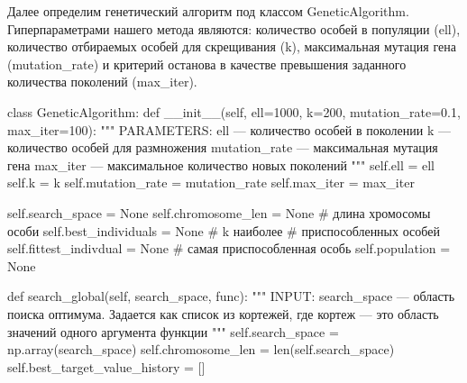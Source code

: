 Далее определим генетический алгоритм под классом GeneticAlgorithm. Гиперпараметрами нашего метода являются: количество особей в популяции (ell), количество отбираемых особей для скрещивания (k), максимальная мутация гена (mutation\_rate) и критерий останова в качестве превышения заданного количества поколений (max\_iter).
\begin{pyin}
class GeneticAlgorithm:
  def __init__(self, ell=1000, k=200, mutation_rate=0.1,
	             max_iter=100):
    """
    PARAMETERS:
    ell --- количество особей в поколении
    k --- количество особей для размножения
    mutation_rate --- максимальная мутация гена
    max_iter --- максимальное количество новых поколений
    """
    self.ell = ell
    self.k = k
    self.mutation_rate = mutation_rate
    self.max_iter = max_iter

    self.search_space = None
    self.chromosome_len = None # длина хромосомы особи
    self.best_individuals = None # k наиболее
    # приспособленных особей
    self.fittest_indivdual = None # самая приспособленная особь
    self.population = None

  def search_global(self, search_space, func):
	    """
	    INPUT:
	    search_space --- область поиска оптимума. Задается как список
	    из кортежей, где кортеж --- это область значений одного
	    аргумента функции
	    """
	    self.search_space = np.array(search_space)
	    self.chromosome_len = len(self.search_space)
	    self.best_target_value_history = []

\end{pyin}

